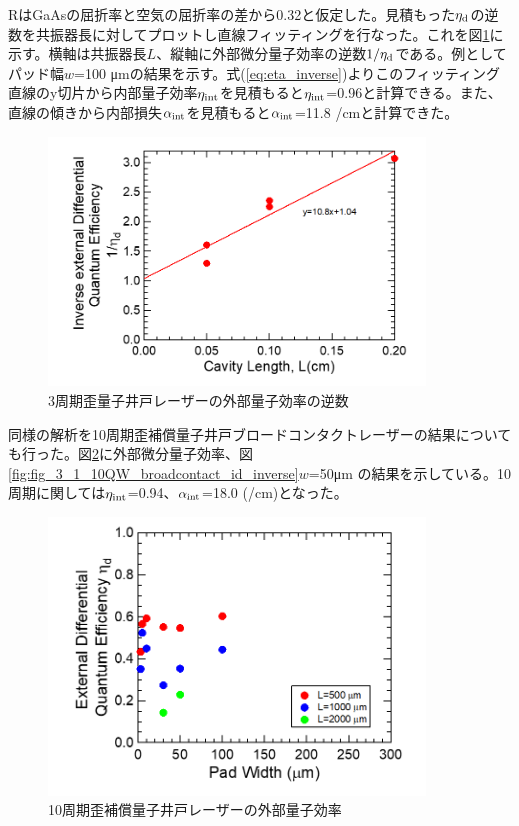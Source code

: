 {RはGaAsの屈折率と空気の屈折率の差から0.32と仮定した。見積もった$\eta_{\rm{d}}$の逆数を共振器長に対してプロットし直線フィッティングを行なった。これを図\ref{fig:fig_3_1_3QW_broadcontact_id_inverse}に示す。横軸は共振器長$L$、縦軸に外部微分量子効率の逆数$1/\eta_{\rm{d}}$である。例としてパッド幅$w$=100 \si{\micro\metre}の結果を示す。式(\ref{eq:eta_inverse})よりこのフィッティング直線のy切片から内部量子効率$\eta_{\rm{int}}$を見積もると$\eta_{\rm{int}}$=0.96と計算できる。また、直線の傾きから内部損失$\alpha_{\rm{int}}$を見積もると$\alpha_{\rm{int}}$=11.8 /cmと計算できた。
\begin{figure}[h]
	\centering
	\includegraphics[width=10cm]{figure/fig_3_1_3QW_broadcontact_id_inverse.png}
	\caption{3周期歪量子井戸レーザーの外部量子効率の逆数}
	\label{fig:fig_3_1_3QW_broadcontact_id_inverse}
\end{figure}



\newpage

同様の解析を10周期歪補償量子井戸ブロードコンタクトレーザーの結果についても行った。図\ref{fig:fig_3_1_10QW_broadcontact_id}に外部微分量子効率、図\ref{fig:fig_3_1_10QW_broadcontact_id_inverse}$w$=50\si{ \micro\metre} の結果を示している。10周期に関しては$\eta_{\rm{int}}$=0.94、$\alpha_{\rm{int}}$=18.0 (/cm)となった。
\begin{figure}[h]
	\centering
	\includegraphics[width=10cm]{figure/fig_3_1_10QW_broadcontact_id.png}
	\caption{10周期歪補償量子井戸レーザーの外部量子効率}
	\label{fig:fig_3_1_10QW_broadcontact_id}
\end{figure}

}
